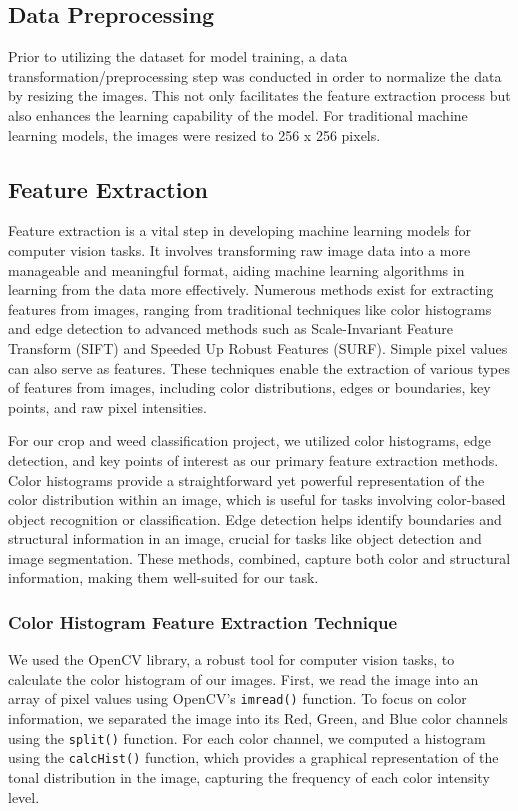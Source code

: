 \documentclass[10pt,twocolumn,letterpaper]{article}
\begin{document}
\subsection{Data Preprocessing}

Prior to utilizing the dataset for model training, a data transformation/preprocessing step was conducted in order to normalize the data by resizing the images. This not only facilitates the feature extraction process but also enhances the learning capability of the model. For traditional machine learning models, the images were resized to 256 x 256 pixels.

\subsection{Feature Extraction}

Feature extraction is a vital step in developing machine learning models for computer vision tasks. It involves transforming raw image data into a more manageable and meaningful format, aiding machine learning algorithms in learning from the data more effectively. Numerous methods exist for extracting features from images, ranging from traditional techniques like color histograms and edge detection to advanced methods such as Scale-Invariant Feature Transform (SIFT) and Speeded Up Robust Features (SURF). Simple pixel values can also serve as features. These techniques enable the extraction of various types of features from images, including color distributions, edges or boundaries, key points, and raw pixel intensities.

For our crop and weed classification project, we utilized color histograms, edge detection, and key points of interest as our primary feature extraction methods. Color histograms provide a straightforward yet powerful representation of the color distribution within an image, which is useful for tasks involving color-based object recognition or classification. Edge detection helps identify boundaries and structural information in an image, crucial for tasks like object detection and image segmentation. These methods, combined, capture both color and structural information, making them well-suited for our task.

\subsubsection{Color Histogram Feature Extraction Technique}

We used the OpenCV library, a robust tool for computer vision tasks, to calculate the color histogram of our images. First, we read the image into an array of pixel values using OpenCV’s \texttt{imread()} function. To focus on color information, we separated the image into its Red, Green, and Blue color channels using the \texttt{split()} function. For each color channel, we computed a histogram using the \texttt{calcHist()} function, which provides a graphical representation of the tonal distribution in the image, capturing the frequency of each color intensity level.
\end{document}
